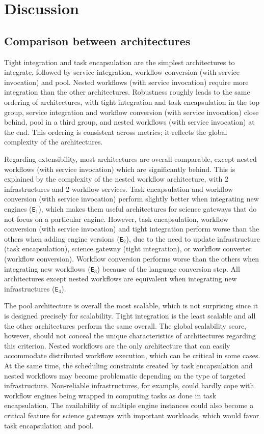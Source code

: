 \documentclass[preprint,3p,twocolumn]{elsarticle}
\begin{document}
\section{Discussion}

\subsection{Comparison between architectures}

Tight integration and task encapsulation are the simplest
architectures to integrate, followed by service integration, workflow conversion (with
service invocation) and pool. Nested workflows (with service
invocation) require more integration than the other
architectures. Robustness roughly leads to the same ordering of
architectures, with tight integration and task encapsulation in the top
group, service integration and workflow conversion (with service
invocation) close behind, pool in a third group, and nested workflows
(with service invocation) at the end. This ordering is consistent
across metrics; it reflects the global complexity of the
architectures.

Regarding extensibility, most architectures are overall comparable,
except nested workflows (with service invocation) which are
significantly behind. This is explained by the complexity of the
nested workflow architecture, with 2 infrastructures and 2 workflow
services. Task encapsulation and workflow conversion (with service
invocation) perform slightly better when integrating new engines
(\texttt{E$_1$}), which makes them useful architectures for science
gateways that do not focus on a particular engine.  However, task encapsulation, workflow conversion (with
service invocation) and tight integration perform worse than the
others when adding engine versions (\texttt{E$_2$}), due to the need
to update infrastructure (task encapsulation), science gateway (tight
integration), or workflow converter (workflow conversion). Workflow conversion
performs worse than the others when integrating new workflows
(\texttt{E$_3$}) because of the language conversion step. All
architectures except nested workflows are equivalent when integrating
new infrastructures (\texttt{E$_4$}).

The pool architecture is overall the most scalable, which is not
surprising since it is designed precisely for scalability. Tight
integration is the least scalable and all the other architectures
perform the same overall. The global scalability score, however,
should not conceal the unique characteristics of architectures regarding
this criterion. Nested workflows are the only architecture that can
easily accommodate distributed workflow execution, which can be
critical in some cases. At the same time, the scheduling constraints
created by task encapsulation and nested workflows may become problematic  depending on the type of targeted
infrastructure. Non-reliable infrastructures,
for example, could hardly cope with workflow engines being wrapped in
computing tasks as done in task encapsulation. The availability of
multiple engine instances could also become a critical feature for
science gateways with important workloads, which would favor task
encapsulation and pool.
\end{document}
